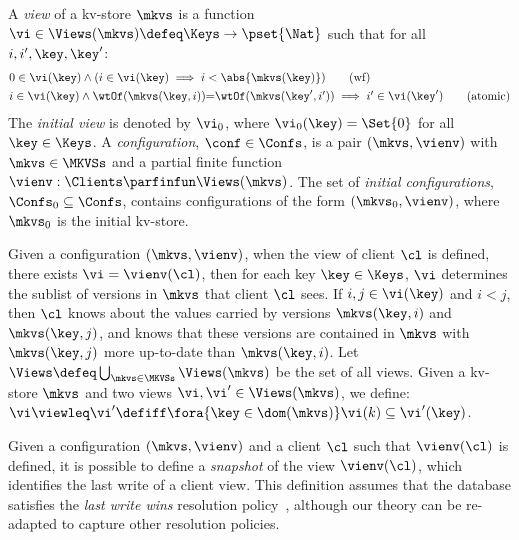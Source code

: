 \begin{definition}[Views]
\label{def:view}
\label{def:cuts}
\label{def:views}
\label{def:configuration}
A \emph{view} of a kv-store $\mkvs$ is a function
$\vi \in \Views(\mkvs) \defeq \Keys \to\pset{\Nat}$ such that for all $i, i', \key, \key'$:
%
{
\begin{align}
    & 
    0 \in \vi(\key) 
    \land (i \in \vi(\key) \implies i < \abs{ \mkvs(\key) }) 
    \tag{wf}
    \label{eq:view.wf}\\
    & 
    \begin{array}{@{}l@{}}
	i \in \vi(\key)  
  	\land \wtOf(\mkvs(\key, i)) {=} \wtOf(\mkvs(\key', i'))  
  	\implies i' \in \vi(\key')
    \end{array}
	\tag{atomic}
	\label{eq:view.atomic}
\end{align}
}
%
\noindent The \emph{initial view} is denoted by $\vi_{0}$, where $\vi_{0}(\key) = \Set{0}$ for all $\key \in \Keys$. 
A \emph{configuration}, $\conf \in \Confs$,  is a pair $ (\mkvs, \vienv)$
with $\mkvs \in \MKVSs$ and a partial finite function
$\vienv : \Clients \parfinfun \Views(\mkvs)$. 
The set of \emph{initial configurations}, $\Confs_0 \subseteq \Confs$, contains configurations of the form $ (\mkvs_0, \vienv)$, where $\mkvs_0$ is the initial kv-store. 
\end{definition}
%


Given a configuration $(\mkvs, \vienv)$, when the view of client 
$\cl$ is defined, \ie there exists $\vi = \vienv(\cl)$, then for each key $\key \in \Keys$, 
$\vi$ determines the sublist of versions in $\mkvs$ that client $\cl$ sees. 
If $i,j \in \vi(\key)$ and $i < j$, then $\cl$ knows about the values 
carried by versions $\mkvs(\key, i)$ and  $\mkvs(\key, j)$, 
and  knows that these versions are contained in $\mkvs$ with  $\mkvs(\key, j)$ more 
up-to-date than $\mkvs(\key, i)$. 
Let $\Views \defeq \bigcup_{\mkvs \in \MKVSs} \Views(\mkvs)$ be the set of all views. 
Given a kv-store $\mkvs$ and two views $\vi, \vi' \in \Views(\mkvs)$, 
we define: $\vi \viewleq \vi' \defiff \fora{\key \in \dom(\mkvs)} \vi(k) \subseteq \vi'(\key)$.

Given a configuration $(\mkvs, \vienv)$ and a client $\cl$ such that $\vienv(\cl)$ is
defined, it is possible to define a \emph{snapshot} of the
view $\vienv  (\cl)$, which identifies the last write of a client
view. This definition assumes that the database satisfies the \emph{last write wins}
resolution policy~\cite{framework-concur}, although our theory can be 
re-adapted to capture other resolution policies. 

